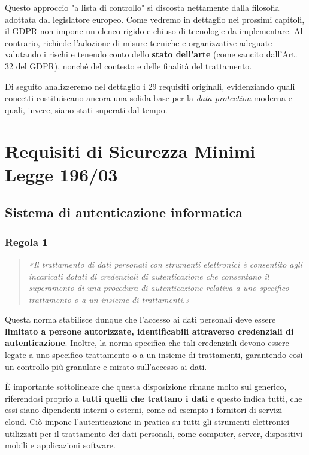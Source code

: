 Questo approccio "a lista di controllo" si discosta nettamente dalla filosofia adottata dal legislatore europeo. Come vedremo in dettaglio nei prossimi capitoli, il GDPR non impone un elenco rigido e chiuso di tecnologie da implementare. Al contrario, richiede l'adozione di misure tecniche e organizzative adeguate valutando i rischi e tenendo conto dello \textbf{stato dell'arte} (come sancito dall'Art. 32 del GDPR), nonché del contesto e delle finalità del trattamento. 

\vspace{0.5cm} 
Di seguito analizzeremo nel dettaglio i 29 requisiti originali, evidenziando quali concetti costituiscano ancora una solida base per la \textit{data protection} moderna e quali, invece, siano stati superati dal tempo.

\section{Requisiti di Sicurezza Minimi Legge 196/03}
\subsection{Sistema di autenticazione informatica}
\subsubsection*{Regola 1}
\begin{quote}
    \textit{«Il trattamento di dati personali con strumenti elettronici è consentito agli incaricati dotati di credenziali di autenticazione che consentano il superamento di una procedura di autenticazione relativa a uno specifico trattamento o a un insieme di trattamenti.»}
\end{quote}

Questa norma stabilisce dunque che l'accesso ai dati personali deve essere \textbf{limitato a persone autorizzate, identificabili attraverso credenziali di autenticazione}. Inoltre, la norma specifica che tali credenziali devono essere legate a uno specifico trattamento o a un insieme di trattamenti, garantendo così un controllo più granulare e mirato sull'accesso ai dati.

È importante sottolineare che questa disposizione rimane molto sul generico, riferendosi proprio a \textbf{tutti quelli che trattano i dati} e questo indica tutti, che essi siano dipendenti interni o esterni, come ad esempio i fornitori di servizi cloud. Ciò impone l'autenticazione in pratica su tutti gli strumenti elettronici utilizzati per il trattamento dei dati personali, come computer, server, dispositivi mobili e applicazioni software.

